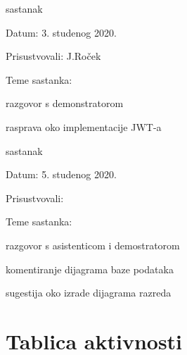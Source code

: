 \begin{packed_enum}
			\item  sastanak
		\item[] \begin{packed_item}
			\item Datum: 3. studenog 2020.
			\item Prisustvovali: J.Roček
			\item Teme sastanka:
			\begin{packed_item}
				\item razgovor s demonstratorom  
				\item rasprava oko implementacije JWT-a 
			\end{packed_item}
		\end{packed_item}
		
			\item  sastanak
		\item[] \begin{packed_item}
			\item Datum: 5. studenog 2020.
			\item Prisustvovali: 
			\item Teme sastanka:
			\begin{packed_item}
				\item razgovor s asistenticom i demostratorom
				\item komentiranje dijagrama baze podataka
				\item sugestija oko izrade dijagrama razreda
			\end{packed_item}
		\end{packed_item}
		
	\end{packed_enum}

		
		
		\eject
		\section*{Tablica aktivnosti}
		
			
					
						
			
